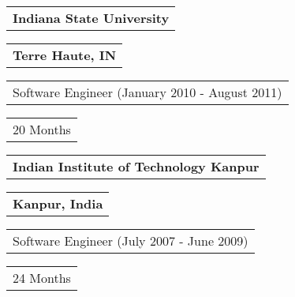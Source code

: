 \documentclass[letterpaper,11pt]{article}
\begin{document}

    \vspace{0.25cm}
    \noindent
    \begin{tabular}[t]{@{}l}
    \textbf{Indiana State University}
    \end{tabular}
    \hfill
    \begin{tabular}[t]{l@{}}
    \textbf{Terre Haute, IN}
    \end{tabular}
    \noindent\newline
    \begin{tabular}[t]{@{}l}
    Software Engineer (January 2010 - August 2011)
    \end{tabular}
    \hfill
    \begin{tabular}[t]{l@{}}
    20 Months
    \end{tabular}


    \vspace{0.25cm}
    \noindent
    \begin{tabular}[t]{@{}l}
    \textbf{Indian Institute of Technology Kanpur}
    \end{tabular}
    \hfill
    \begin{tabular}[t]{l@{}}
    \textbf{Kanpur, India}
    \end{tabular}
    \noindent\newline
    \begin{tabular}[t]{@{}l}
    Software Engineer (July 2007 - June 2009)
    \end{tabular}
    \hfill
    \begin{tabular}[t]{l@{}}
    24 Months
    \end{tabular}
    
\end{document}
